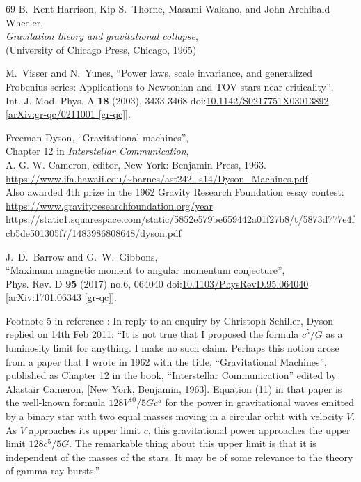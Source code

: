 \documentclass[12pt]{article}
\begin{document}
\begin{thebibliography}{69}
B.~Kent Harrison, Kip S.~Thorne, Masami Wakano, and John Archibald Wheeler,\\
\emph{Gravitation theory and gravitational collapse},\\
(University of Chicago Press, Chicago, 1965)

\clearpage
{} %
M.~Visser and N.~Yunes,
``Power laws, scale invariance, and generalized Frobenius series: Applications to Newtonian and TOV stars near criticality'',\\
Int. J. Mod. Phys. A \textbf{18} (2003), 3433-3468
doi:\href{https://doi.org/10.1142/S0217751X03013892}{10.1142/S0217751X03013892}
[\href{https://www.arxiv.org/abs/gr-qc/0211001}{arXiv:gr-qc/0211001 [gr-qc]}].


Freeman Dyson,
``Gravitational machines'', \\
Chapter 12 in \emph{Interstellar Communication}, \\
A. G. W. Cameron, editor, New York: Benjamin Press, 1963.\\
\url{https://www.ifa.hawaii.edu/~barnes/ast242_s14/Dyson_Machines.pdf}\\
Also awarded 4th prize in the 1962 Gravity Research Foundation essay contest:\\
\url{https://www.gravityresearchfoundation.org/year}
\url{https://static1.squarespace.com/static/5852e579be659442a01f27b8/t/5873d777e4fcb5de501305f7/1483986808648/dyson.pdf}

J.~D.~Barrow and G.~W.~Gibbons,\\
``Maximum magnetic moment to angular momentum conjecture'',\\
Phys. Rev. D \textbf{95} (2017) no.6, 064040
doi:\href{https://doi.org/10.1103/PhysRevD.95.064040}{10.1103/PhysRevD.95.064040}
[\href{https://www.arxiv.org/abs/1701.06343}{arXiv:1701.06343 [gr-qc]}].

Footnote 5 in reference \cite{Barrow:2017}:
In reply to an enquiry by Christoph Schiller, Dyson replied on 14th Feb 2011: ``It is not true that I proposed the formula $c^5/G$ as a luminosity limit for anything. I make no such claim. Perhaps this notion arose from a paper that I wrote in 1962 with the title, ``Gravitational Machines'', published as Chapter 12 in the book, ``Interstellar Communication'' edited by Alastair Cameron, [New York, Benjamin, 1963]. Equation (11) in that paper is the well-known formula $128V^{10}/5Gc^5$ for the power in gravitational waves emitted by a binary star with two equal masses moving in a circular orbit with velocity $V$. As $V$ approaches its upper limit $c$, this gravitational power approaches the upper limit $128c^5/5G$. The remarkable thing about this upper limit is that it is independent of the masses of the stars. It may be of some relevance to the theory of gamma-ray bursts.''


\end{thebibliography}
\end{document}
